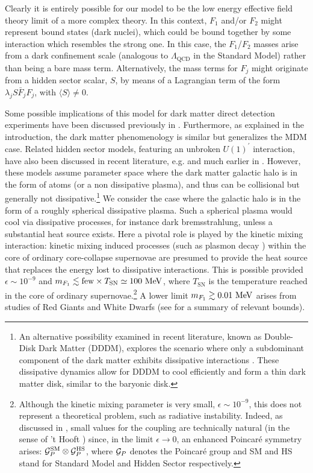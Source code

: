 \documentclass[12pt]{article}
\begin{document}
Clearly it is entirely possible for our model to be the low energy
effective field theory limit of a more complex theory. In this context,
$F _1$ and/or $F _2$ might represent bound states (dark nuclei), which
could be bound together by some interaction which resembles the strong
one. In this case, the $F_1$/$F_2$ masses arise from a dark confinement
scale (analogous to $\Lambda _{\text{QCD}}$ in the Standard Model)
rather than being a bare mass term. Alternatively, the mass terms for $F
_j$ might originate from a hidden sector scalar, $S$, by means of a
Lagrangian term of the form $\lambda _jS\bar{F} _jF _j$, with $\langle S
\rangle \neq 0$.

Some possible implications of this model for dark matter direct
detection experiments have been discussed previously in
\cite{hiddensector}. Furthermore, as explained in the introduction, the
dark matter phenomenology is similar but generalizes the MDM case.
Related hidden sector models, featuring an unbroken $U(1) ^{'}$
interaction, have also been discussed in recent literature, e.g.
\cite{feng,cline6,petrakiatomic} and much earlier in
\cite{goldberghall}. However, these models assume parameter space where
the dark matter galactic halo is in the form of atoms (or a non
dissipative plasma), and thus can be collisional but generally not
dissipative.\footnote{An alternative possibility examined in recent
literature, known as Double-Disk Dark Matter (DDDM), explores the
scenario where only a subdominant component of the dark matter exhibits
dissipative interactions \cite{dddm}. These dissipative dynamics allow
for DDDM to cool efficiently and form a thin dark matter disk, similar
to the baryonic disk.} We consider the case where the galactic halo is
in the form of a roughly spherical dissipative plasma. Such a spherical
plasma would cool via dissipative processes, for instance dark
bremsstrahlung, unless a substantial heat source exists. Here a pivotal
role is played by the 
kinetic mixing interaction: kinetic mixing induced processes 
(such as plasmon decay \cite{raf,updated}) 
within the core of ordinary core-collapse supernovae 
are presumed to provide the heat source that replaces the energy lost to
dissipative interactions. This is possible provided $\epsilon \sim 10
^{-9}$ and $m _{F_1} \lesssim {\rm few} \times T _{\text{SN}} \simeq 100
\ {\rm MeV}$, where $T _{\text{SN}}$ is the temperature reached in the
core of ordinary supernovae.\footnote{Although the kinetic mixing
parameter is very small, $\epsilon \sim 10 ^{-9}$, this does not
represent a theoretical problem, such as radiative instability. Indeed,
as discussed in \cite{poincare}, small values for the coupling are
technically natural (in the sense of 't Hooft \cite{hooft}) since, in the limit
$\epsilon \rightarrow 0$, an enhanced Poincar\'e symmetry arises: ${\cal
G} _P ^{\text{SM}} \otimes {\cal G} _P ^{\text{HS}}$, where ${\cal G}
_P$ denotes the Poincar\'e group and SM and HS stand for Standard Model
and Hidden Sector respectively.} A lower limit $m _{F_1} \gtrsim 0.01 \
{\rm MeV}$ arises from studies of Red Giants \cite{redgiants} and White
Dwarfs \cite{whitedwarfs,updated} (see \cite{bailey} for a summary of
relevant bounds).
\end{document}
